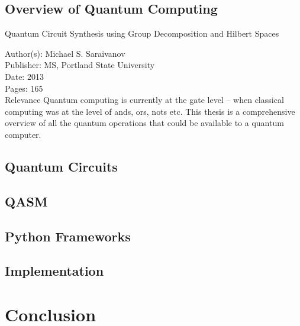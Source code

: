 \documentclass[conference]{IEEEtran}
\begin{document}
\subsection{Overview of Quantum Computing}


Quantum Circuit Synthesis using Group Decomposition and Hilbert Spaces

    Author(s): Michael S. Saraivanov \\
    Publisher: MS, Portland State University \\
    Date: 2013 \\
    Pages: 165 \\
    Relevance Quantum computing is currently at the gate level -- when classical computing was at the level of ands, ors, nots etc. This thesis is a comprehensive overview of all the quantum operations that could be available to a quantum computer.


\subsection{Quantum Circuits}

\subsection{QASM}

\subsection{Python Frameworks}


\subsection{Implementation}


\section{Conclusion}
\end{document}
